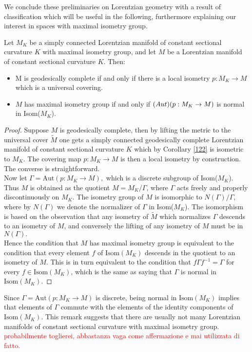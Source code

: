 We conclude these preliminaries on Lorentzian geometry with a result of classification which will be useful in the following, furthermore explaining our interest in spaces with maximal isometry group.
\begin{proposition}\label{classification}
    Let $M_K$ be a simply connected Lorentzian manifold of constant sectional curvature $K$ with maximal isometry group, and let $M$ be a Lorentzian manifold of constant sectional curvature $K$. Then: 
    \begin{itemize}
        \item M is geodesically complete if and only if there is a local isometry $p:M_K\to M$ which is a universal covering.
        \item $M$ has maximal isometry group if and only if $\text(Aut)(p:M_K\to M)$ is normal in Isom($M_K$). 
    \end{itemize}
\end{proposition}

\begin{proof}
    Suppose $M$ is geodesically complete, then by lifting the metric to the universal cover $\widetilde{M}$ one gets a simply connected geodesically complete Lorentzian manifold of constant sectional curvature $K$ which by Corollary \ref{122} is isometric to $M_K$. The covering map $p:M_K\to M$ is then a local isometry by construction. The converse is straightforward. \\   
    Now let $\Gamma=\text{Aut}(p:M_K\to M),$ which is a discrete subgroup of Isom($M_K$). Thus $M$ is obtained as the quotient $M=M_{K}/\Gamma$, where $\Gamma$ acts freely and properly discontinuously on $M_K$. The isometry group of $M$ is isomorphic to $N(\Gamma)/\Gamma$, where by $N(\Gamma)$ we denote the normalizer of $\Gamma$ in Isom($M_K$). The isomorphism is based on the observation that any isometry of $\widetilde{M}$ which normalizes $\Gamma$ descends to an isometry of $M$, and conversely the lifting of any isometry of $M$ must be in $N(\Gamma).$\\
    Hence the condition that $M$ has maximal isometry group is equivalent to the condition that every element $f$ of $\text{Isom}(M_K)$ descends in the quotient to an isometry of $M$. This is in turn equivalent to the condition that $f\Gamma f^{-1}=\Gamma$ for every $f\in \text{Isom}(M_K)$, which is the same as saying that $\Gamma$ is normal in $\text{Isom}(M_K)$.
\end{proof}

\begin{observation}
Since $\Gamma=\text{Aut}(p:M_K\to M)$ is discrete, being normal in $\text{Isom}(M_K)$ implies that elements of $\Gamma$ commute with the elements of the identity components of $\text{Isom}(M_K)$. This remark suggests that there are usually not many Lorentzian manifolds of constant sectional curvature with maximal isometry group. \textcolor{red}{probabilmente toglierei, abbastanza vaga come affermazione e mai utilizzata di fatto.}
\end{observation}

